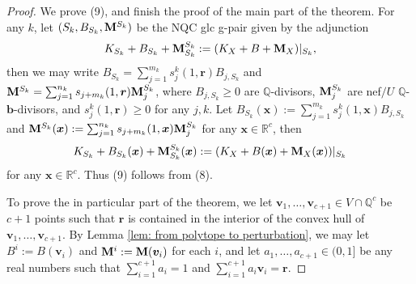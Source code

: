 \documentclass[11pt]{amsart}
\numberwithin{equation}{section}
\newcommand{\bb}{\bm{b}}
\newcommand{\Mm}{{\bf{M}}}
\newcommand{\Qq}{\mathbb{Q}}
\theoremstyle{definition}
\theoremstyle{definition}
\theoremstyle{definition}
\begin{document}
\begin{proof}
We prove (9), and finish the proof of the main part of the theorem. For any $k$, let $(S_k,B_{S_k},\Mm^{S_k})$ be the NQC glc g-pair given by the adjunction
$$K_{S_k}+B_{S_k}+\Mm^{S_k}_{S_k}:=(K_X+B+\Mm_X)|_{S_k},$$
then we may write $B_{S_k}=\sum_{j=1}^{m_k}s^k_j(1,\bm{r})B_{j,S_k}$ and $\Mm^{S_k}=\sum_{j=1}^{n_k}s_{j+m_k}(1,\bm{r})\Mm^{S_k}_j$, where $B_{j,S_k}\geq 0$ are $\Qq$-divisors, $\Mm_j^{S_k}$ are nef$/U$ $\Qq$-$\bb$-divisors, and $s_j^k(1,\bm{r})\geq 0$ for any $j,k$. Let $B_{S_k}(\bm{x}):=\sum_{j=1}^{m_k}s^k_j(1,\bm{x})B_{j,S_k}$ and $\Mm^{S_k}(\bm{x}):=\sum_{j=1}^{n_k}s_{j+m_k}(1,\bm{x})\Mm^{S_k}_j$ for any $\bm{x}\in\mathbb R^c$, then
$$K_{S_k}+B_{S_k}(\bm{x})+\Mm^{S_k}_{S_k}(\bm{x}):=(K_X+B(\bm{x})+\Mm_X(\bm{x}))|_{S_k}$$
for any $\bm{x}\in\mathbb R^c$. Thus (9) follows from (8).

To prove the in particular part of the theorem, we let $\bm{v}_1,\dots,\bm{v}_{c+1}\in V\cap\mathbb Q^c$ be $c+1$ points such that $\bm{r}$ is contained in the interior of the convex hull of $\bm{v}_1,\dots,\bm{v}_{c+1}$. By Lemma \ref{lem: from polytope to perturbation}, we may let $B^i:=B(\bm{v}_i)$ and $\Mm^i:=\Mm(\bm{v}_i)$ for each $i$, and let $a_1,\dots,a_{c+1}\in (0,1]$ be any real numbers such that $\sum_{i=1}^{c+1}a_i=1$ and $\sum_{i=1}^{c+1}a_i\bm{v}_i=\bm{r}$.
\end{proof}
\end{document}
